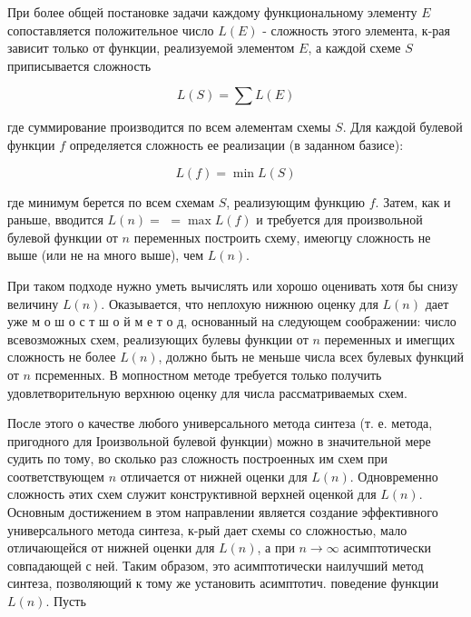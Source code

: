 \documentclass[10pt]{article}
\begin{document}
При более общей постановке задачи каждому функциональному элементу $E$ сопоставляется положительное число $L(E)$ - сложность этого элемента, к-рая зависит только от функции, реализуемой элементом $E$, а каждой схеме $S$ приписывается сложность



\[

L(S)=\sum L(E)

\]



где суммирование производится по всем әлементам схемы $S$. Для каждой булевой функции $f$ определяется сложность ее реализации (в заданном базисе):



\[

L(f)=\min L(S)

\]



где минимум берется по всем схемам $S$, реализующим функцию $f$. Затем, как и раньше, вводится $L(n)=$ $=\max L(f)$ и требуется для произвольной булевой функции от $n$ переменных построить схему, имеюгцу сложность не выше (или не на много выше), чем $L(n)$.



При таком подходе нужно уметь вычислять или хорошо оценивать хотя бы снизу величину $L(n)$. Оказывается, что неплохую нижнюю оценку для $L(n)$ дает уже м о ш о с т ш о й м е т о д, основанный на следующем соображении: число всевозможных схем, реализующих булевы функции от $n$ переменных и имегщих сложность не более $L(n)$, должно быть не меньше числа всех булевых функций от $n$ псременных. В мопностном методе требуется только получить удовлетворительную верхнюю оценку для числа рассматриваемых схем.



После этого о качестве любого универсального метода синтеза (т. е. метода, пригодного для Іроизвольной булевой функции) можно в значительной мере судить по тому, во сколько раз сложность построенных им схем при соответствующем $n$ отличается от нижней оценки для $L(n)$. Одновременно сложность әтих схем служит конструктивной верхней оценкой для $L(n)$. Основным достижением в этом направлении является создание эффективного универсального метода синтеза, к-рый дает схемы со сложностью, мало отличающейся от нижней оценки для $L(n)$, а при $n \rightarrow \infty$ асимптотически совпадающей с ней. Таким образом, это асимптотически наилучший метод синтеза, позволяющий к тому же установить асимптотич. поведение функции $L(n)$. Пусть
\end{document}
